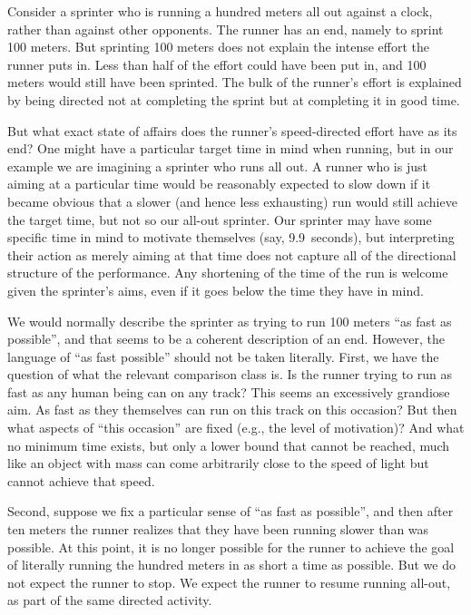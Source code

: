 Consider a sprinter who is running a hundred meters all out against a clock, rather than against other opponents. The runner has an end, 
namely to sprint 100 meters. But sprinting 100 meters does not explain the intense effort the runner puts in. Less than half of the effort 
could have been put in, and 100 meters would still have been sprinted. The bulk of the runner's effort is explained by being directed 
not at completing the sprint but at completing it in good time.

But what exact state of affairs does the runner's speed-directed effort have as its end? One might have a particular target time in mind when running, but in our example we are imagining a sprinter who runs all out. A runner who is just aiming at a particular time would be reasonably expected to slow down if it became obvious
that a slower (and hence less exhausting) run would still achieve the target time, but not so our all-out sprinter. Our sprinter may have some specific time in mind
to motivate themselves (say, 9.9~seconds), but interpreting their action as merely aiming at that time does not capture all of the directional structure 
of the performance. Any shortening of the time of the run is welcome given the sprinter's aims, even if it goes
below the time they have in mind.

We would normally describe the sprinter as trying to run 100 meters ``as fast as possible'', and that seems to be a coherent description
of an end. However, the language of ``as fast possible'' should not be taken literally. First, we have the question of what the relevant
comparison class is. Is the runner trying to run as fast as any human being can on any track? This seems an excessively
grandiose aim. As fast as they themselves can run on this track on this occasion? But then what aspects of ``this occasion'' are 
fixed (e.g., the level of motivation)? And what no minimum time exists, but only a lower bound that cannot be reached, much like
an object with mass can come arbitrarily close to the speed of light but cannot achieve that speed.

Second, suppose we fix a particular sense of ``as fast as possible'', and then after ten meters the runner realizes that they have
been running slower than was possible. At this point, it is no longer possible for the runner to achieve the goal of literally running
the hundred meters in as short a time as possible. But we do not expect the runner to stop. We expect the runner to resume running all-out, as part of the
same directed activity.

